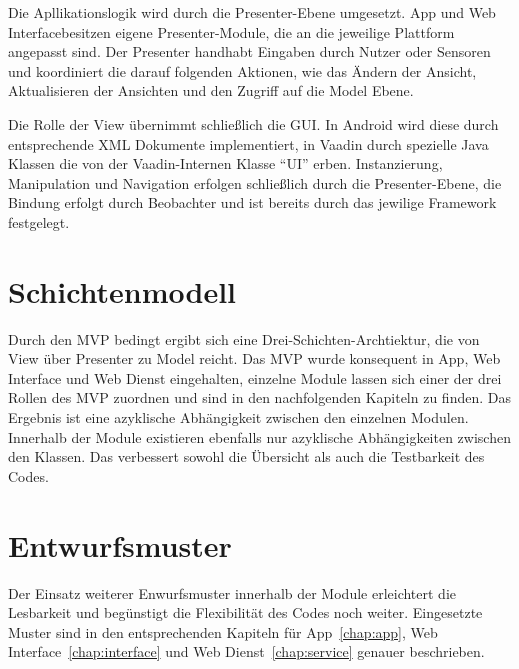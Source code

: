 Die Apllikationslogik wird durch die Presenter-Ebene umgesetzt. App und Web Interfacebesitzen eigene Presenter-Module, die an die jeweilige Plattform angepasst sind. Der Presenter handhabt Eingaben durch Nutzer oder Sensoren und koordiniert die darauf folgenden Aktionen, wie das Ändern der Ansicht, Aktualisieren der Ansichten und den Zugriff auf die Model Ebene.\newline\par 

Die Rolle der View übernimmt schließlich die GUI. In Android wird diese durch entsprechende XML Dokumente implementiert, in Vaadin durch spezielle Java Klassen die von der Vaadin-Internen Klasse ``UI'' erben. Instanzierung, Manipulation und Navigation erfolgen schließlich durch die Presenter-Ebene, die Bindung erfolgt durch Beobachter und ist bereits durch das jewilige Framework festgelegt.

\section{Schichtenmodell}
Durch den MVP bedingt ergibt sich eine Drei-Schichten-Archtiektur, die von View über Presenter zu Model reicht. Das MVP wurde konsequent in App, Web Interface und Web Dienst eingehalten, einzelne Module lassen sich einer der drei Rollen des MVP zuordnen und sind in den nachfolgenden Kapiteln zu finden. Das Ergebnis ist eine azyklische Abhängigkeit zwischen den einzelnen Modulen.\newline
Innerhalb der Module existieren ebenfalls nur azyklische Abhängigkeiten zwischen den Klassen. Das verbessert sowohl die Übersicht als auch die Testbarkeit des Codes.

\section{Entwurfsmuster}
Der Einsatz weiterer Enwurfsmuster innerhalb der Module erleichtert die Lesbarkeit und begünstigt die Flexibilität des Codes noch weiter. Eingesetzte Muster sind in den entsprechenden Kapiteln für App~\eqref{chap:app}, Web Interface~\eqref{chap:interface} und Web Dienst~\eqref{chap:service} genauer beschrieben.